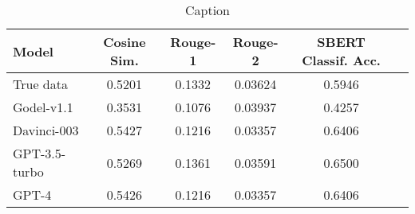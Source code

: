 

\begin{table}[ht]
\begin{adjustbox}{center}
\begin{tabular}{lccccc}
\hline
 Model                         &   Cosine Sim. &   Rouge-1 &   Rouge-2 &     SBERT Classif. Acc. \\
\hline
 True data &      0.5201 &  0.1332  & 0.03624 &                    0.5946 \\
 Godel-v1.1                    &      0.3531 &  0.1076 & 0.03937  &                      0.4257 \\
 Davinci-003                   &      0.5427 &  0.1216 & 0.03357 &                        0.6406 \\
 GPT-3.5-turbo                 &      0.5269 &  0.1361 & 0.03591 &                       0.6500     \\
 GPT-4                         &      0.5426 &  0.1216 & 0.03357 &                   0.6406 \\
\hline
\end{tabular}
\end{adjustbox}
\vspace{5pt}
\caption{Caption}
    \label{tab:my_label}
\end{table}
